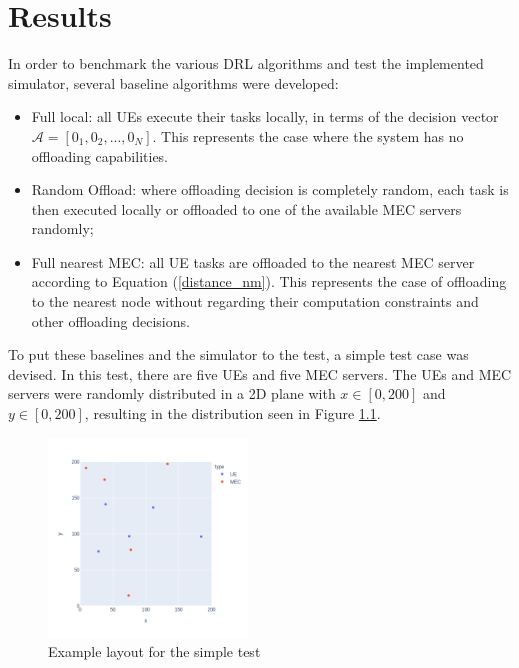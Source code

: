 \chapter{Results}


\noindent In order to benchmark the various \acrshort{DRL} algorithms and test the implemented simulator, several baseline algorithms were developed:

\begin{itemize}
    \item Full local: all \acrshort{UE}s execute their tasks locally, in terms of the decision vector $\mathcal{A}=[0_1, 0_2, ..., 0_N]$. This represents the case where the system has no offloading capabilities.
    \item Random Offload: where offloading decision is completely random, each task is then executed locally or offloaded to one of the available \acrshort{MEC} servers randomly;
    \item Full nearest \acrshort{MEC}: all \acrshort{UE} tasks are offloaded to the nearest \acrshort{MEC} server according to Equation (\ref{distance_nm}). This represents the case of offloading to the nearest node without regarding their computation constraints and other offloading decisions.
\end{itemize}

To put these baselines and the simulator to the test, a simple test case was devised. In this test, there are five \acrshort{UE}s and five \acrshort{MEC} servers. The UEs and MEC servers were randomly distributed in a 2D plane with $x \in [0, 200]$ and $y \in [0, 200]$, resulting in the distribution seen in Figure \ref{example_layout}.

\begin{figure}[h]
  \centering
  \includegraphics[width=200px]{images/example_layout.png}
  \caption{Example layout for the simple test}  \label{example_layout}
\end{figure}

